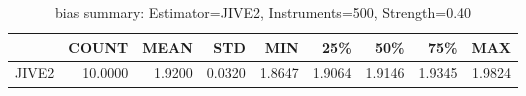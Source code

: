 \begin{table}[ht]
\centering
\caption{bias summary: Estimator=JIVE2, Instruments=500, Strength=0.40}
\begin{tabular}{lrrrrrrrr}
\toprule
 & COUNT & MEAN & STD & MIN & 25\% & 50\% & 75\% & MAX \\
\midrule
JIVE2 & 10.0000 & 1.9200 & 0.0320 & 1.8647 & 1.9064 & 1.9146 & 1.9345 & 1.9824 \\
\bottomrule
\end{tabular}
\end{table}
